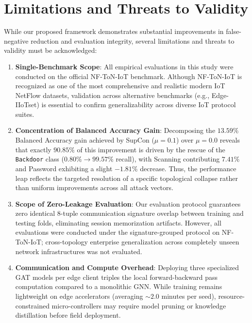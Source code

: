 \documentclass[journal,onecolumn]{IEEEtran}
\begin{document}
\section{Limitations and Threats to Validity}
\label{sec:limitations}

While our proposed framework demonstrates substantial improvements in false-negative reduction and evaluation integrity, several limitations and threats to validity must be acknowledged:

\begin{enumerate}
    \item \textbf{Single-Benchmark Scope}: All empirical evaluations in this study were conducted on the official NF-ToN-IoT benchmark. Although NF-ToN-IoT is recognized as one of the most comprehensive and realistic modern IoT NetFlow datasets, validation across alternative benchmarks (e.g., Edge-IIoTset) is essential to confirm generalizability across diverse IoT protocol suites.
    \item \textbf{Concentration of Balanced Accuracy Gain}: Decomposing the $13.59\%$ Balanced Accuracy gain achieved by SupCon ($\mu = 0.1$) over $\mu = 0.0$ reveals that exactly $\mathbf{90.85\%}$ of this improvement is driven by the rescue of the \texttt{Backdoor} class ($0.80\% \to 99.57\%$ recall), with Scanning contributing $7.41\%$ and Password exhibiting a slight $-1.81\%$ decrease. Thus, the performance leap reflects the targeted resolution of a specific topological collapse rather than uniform improvements across all attack vectors.
    \item \textbf{Scope of Zero-Leakage Evaluation}: Our evaluation protocol guarantees zero identical 8-tuple communication signature overlap between training and testing folds, eliminating session memorization artifacts. However, all evaluations were conducted under the signature-grouped protocol on NF-ToN-IoT; cross-topology enterprise generalization across completely unseen network infrastructures was not evaluated.
    \item \textbf{Communication and Compute Overhead}: Deploying three specialized GAT models per edge client triples the local forward-backward pass computation compared to a monolithic GNN. While training remains lightweight on edge accelerators (averaging $\sim 2.0$ minutes per seed), resource-constrained micro-controllers may require model pruning or knowledge distillation before field deployment.

\end{enumerate}
\end{document}
